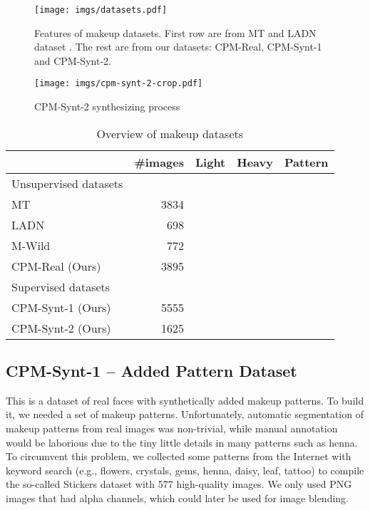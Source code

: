 \documentclass[final]{cvpr}
\newcommand{\cmark}{\ding{51}}
\begin{document}
\begin{figure}[t]
\centering
\vspace{-1.5mm}
\texttt{[image: imgs/datasets.pdf]}
\vskip -0.1in
\caption{Features of makeup datasets. First row are from MT \cite{beautygan} and LADN dataset \cite{gu2019ladn}. The rest are from our datasets: CPM-Real, CPM-Synt-1 and CPM-Synt-2.}
    \vspace{-5mm}
\label{fig:makeup_style}
\end{figure}

\begin{figure}[t]
\centering 
\texttt{[image: imgs/cpm-synt-2-crop.pdf]}
\vskip -0.1in
   \caption{CPM-Synt-2 synthesizing process}
\label{fig:cpm-synt-2}
\vspace{-3mm}
\end{figure}

\begin{table}[t]
\small
  \centering
\setlength{\tabcolsep}{5.2pt}
  \begin{tabular}[t]{lrccc}
    \toprule
    &\#images&Light&Heavy&Pattern\\
    \hline
    Unsupervised datasets\\
    MT \cite{beautygan}&3834&\cmark&&\\
    LADN \cite{gu2019ladn}&698&\cmark&\cmark&\text{}\\
    M-Wild \cite{jiang2019psgan} &772&\cmark&&\\
    CPM-Real (Ours) &3895&\cmark&\cmark&\cmark\\
    \hline
    Supervised datasets\\
    CPM-Synt-1 (Ours) & 5555&\cmark&\cmark&\cmark\\
    CPM-Synt-2 (Ours) & 1625 &\cmark & &\cmark\\
\bottomrule 
    \end{tabular}
  \vskip -0.1in
  \caption{Overview of makeup datasets }
    \label{tab:datasets}
    \vspace{-4mm}
\end{table}

\subsection{CPM-Synt-1 -- Added Pattern Dataset}\label{se:dataset_synt1}
\vspace{-1mm}
This is a dataset of real faces with synthetically added makeup patterns. To build it, we needed a set of makeup patterns. Unfortunately, automatic segmentation of makeup patterns from real images was non-trivial, while manual annotation would be laborious due to the tiny little details in many patterns such as henna. To circumvent this problem, we collected some patterns from the Internet with keyword search (e.g., flowers, crystals, gems, henna, daisy, leaf, tattoo) to compile the so-called Stickers dataset with 577 high-quality images. We only used PNG images that had alpha channels, which could later be used for image blending.
\end{document}
